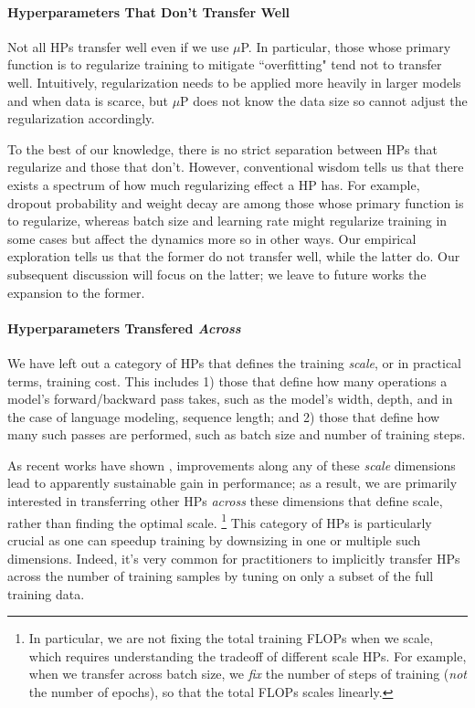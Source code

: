 \documentclass{article}
\theoremstyle{definition}
\begin{document}
\paragraph{Hyperparameters That Don't Transfer Well}
Not all HPs transfer well even if we use $\mu$P.
In particular, those whose primary function is to regularize training to mitigate ``overfitting" tend not to transfer well.
Intuitively, regularization needs to be applied more heavily in larger models and when data is scarce, but $\mu$P does not know the data size so cannot adjust the regularization accordingly.

To the best of our knowledge, there is no strict separation between HPs that regularize and those that don't.
However, conventional wisdom tells us that there exists a spectrum of how much regularizing effect a HP has.
For example, dropout probability and weight decay are among those whose primary function is to regularize, whereas batch size and learning rate might regularize training in some cases but affect the dynamics more so in other ways.
Our empirical exploration tells us that the former do not transfer well, while the latter do.
Our subsequent discussion will focus on the latter; we leave to future works the expansion to the former.

\paragraph{Hyperparameters Transfered \emph{Across}}

We have left out a category of HPs that defines the training \emph{scale}, or in practical terms, training cost.
This includes 1) those that define how many operations a model's forward/backward pass takes, such as the model's width, depth, and in the case of language modeling, sequence length; and 2) those that define how many such passes are performed, such as batch size and number of training steps.

As recent works have shown \citep{rosenfeld_constructive_2019,brown2020language,kaplan_scaling_2020}, improvements along any of these \emph{scale} dimensions lead to apparently sustainable gain in performance; as a result, we are primarily interested in transferring other HPs \emph{across} these dimensions that define scale, rather than finding the optimal scale.
\footnote{
In particular, we are not fixing the total training FLOPs when we scale, which requires understanding the tradeoff of different scale HPs.
For example, when we transfer across batch size, we \emph{fix} the number of steps of training (\emph{not} the number of epochs), so that the total FLOPs scales linearly.}
This category of HPs is particularly crucial as one can speedup training by downsizing in one or multiple such dimensions.
Indeed, it's very common for practitioners to implicitly transfer HPs across the number of training samples by tuning on only a subset of the full training data.
\end{document}
